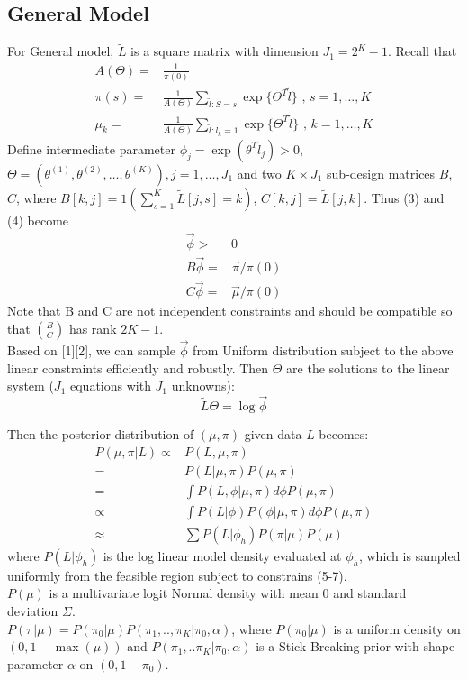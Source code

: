 \documentclass[11 pt, a4paper]{article}  %
\begin{document}
\subsection{General Model}
For General model, $\tilde{L}$ is a square matrix with dimension $J_1 = 2^K-1$. Recall that 
\begin{align}
A(\Theta) = & \frac{1}{\pi(0)} \nonumber \\
\pi(s) = & \frac{1}{A(\Theta)} \sum_{\tilde{l}:S=s}\exp \{ \Theta^T \tilde{l}\}  \text{ , } s = 1,\ldots, K \\
\mu_k = & \frac{1}{A(\Theta)} \sum_{\tilde{l}:l_k=1}\exp \{ \Theta^T \tilde{l}\}  \text{ , } k = 1, \ldots, K
\end{align}
Define intermediate parameter $\phi_j = \exp(\theta^T\tilde{l}_j) >0$, $\Theta = (\theta^{(1)},\theta^{(2)}, \ldots, \theta^{(K)}), j= 1, \ldots, J_1$ and two $K \times J_1$ sub-design matrices $B$, $C$, where $B[k,j] = 1(\sum_{s=1}^K\tilde{L}[j,s]=k)$, $C[k,j] = \tilde{L}[j,k]$. Thus (3) and (4) become
\begin{align}
\vec{\phi} > & 0\\
B \vec{\phi} = & \vec{\pi}/\pi(0)\\ 
C \vec{\phi} = & \vec{\mu}/\pi(0)
\end{align}
Note that B and C are not independent constraints and should be compatible so that $\binom{B}{C}$ has rank $2K-1$.\\
Based on [1][2], we can sample $\vec{\phi}$ from Uniform distribution subject to the above linear constraints efficiently and robustly. Then $\Theta$ are the solutions to the linear system ($J_1$ equations with $J_1$ unknowns):
\[\tilde{L}\Theta = \log \vec{\phi}\]

Then the posterior distribution of $(\mu, \pi)$ given data $L$ becomes:
\begin{align*}
P(\mu, \pi |L) \propto & P(L, \mu, \pi) \\
= & P(L | \mu, \pi) P(\mu, \pi) \\
= & \int P(L, \phi | \mu, \pi) d \phi P(\mu, \pi) \\
\propto & \int P(L | \phi) P(\phi | \mu,\pi) d \phi P(\mu, \pi) \\
\approx & \sum P(L | \phi_h) P(\pi | \mu) P(\mu)
\end{align*}
where $P(L | \phi_h)$ is the log linear model density evaluated at $\phi_h$, which is sampled uniformly from the feasible region subject to constrains (5-7).\\
$P(\mu)$ is a multivariate logit Normal density with mean $0$ and standard deviation $\Sigma$.\\
$P(\pi | \mu) = P(\pi_0 | \mu)P(\pi_1,.., \pi_K |\pi_0, \alpha)$, where $P(\pi_0 | \mu)$ is a uniform density on $(0, 1-\max(\mu))$ and $P(\pi_1,..\pi_K |\pi_0, \alpha)$ is a Stick Breaking prior with shape parameter $\alpha$ on $(0, 1-\pi_0)$.
\end{document}
